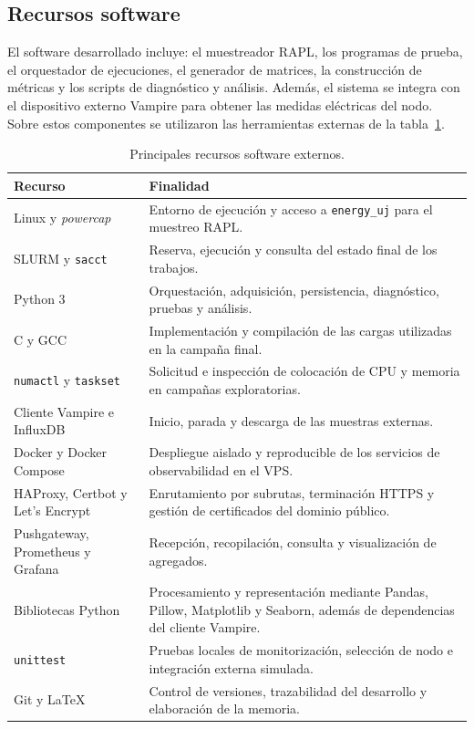 \subsection{Recursos software}
\label{subsec:recursos-software}

El software desarrollado incluye: el muestreador RAPL, los programas de prueba, el orquestador de ejecuciones, el generador de matrices, la construcción de métricas y los scripts de diagnóstico y análisis. Además, el sistema se integra con el dispositivo externo Vampire para obtener las medidas eléctricas del nodo. Sobre estos componentes se utilizaron las herramientas externas de la tabla~\ref{tab:recursos-software}.

\begin{table}[htbp]
    \centering
    \small
    \caption{Principales recursos software externos.}
    \label{tab:recursos-software}
    \begin{tabular}{p{}p{}}
        \hline
        Recurso & Finalidad \\
        \hline
        Linux y \emph{powercap} & Entorno de ejecución y acceso a \texttt{energy\_uj} para el muestreo RAPL. \\
        SLURM y \texttt{sacct} & Reserva, ejecución y consulta del estado final de los trabajos. \\
        Python 3 & Orquestación, adquisición, persistencia, diagnóstico, pruebas y análisis. \\
        C y GCC & Implementación y compilación de las cargas utilizadas en la campaña final. \\
        \texttt{numactl} y \texttt{taskset} & Solicitud e inspección de colocación de CPU y memoria en campañas exploratorias. \\
        Cliente Vampire e InfluxDB & Inicio, parada y descarga de las muestras externas. \\
        Docker y Docker Compose & Despliegue aislado y reproducible de los servicios de observabilidad en el VPS. \\
        HAProxy, Certbot y Let's Encrypt & Enrutamiento por subrutas, terminación HTTPS y gestión de certificados del dominio público. \\
        Pushgateway, Prometheus y Grafana & Recepción, recopilación, consulta y visualización de agregados. \\
        Bibliotecas Python & Procesamiento y representación mediante Pandas, Pillow, Matplotlib y Seaborn, además de dependencias del cliente Vampire. \\
        \texttt{unittest} & Pruebas locales de monitorización, selección de nodo e integración externa simulada. \\
        Git y LaTeX & Control de versiones, trazabilidad del desarrollo y elaboración de la memoria. \\
        \hline
    \end{tabular}
\end{table}

